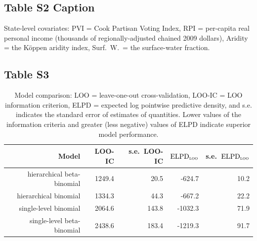 \documentclass[draft]{agujournal}
\begin{document}
\subsection*{Table S2 Caption}
\begin{table}[H]
\centering
\caption{State-level covariates: PVI = Cook Partisan Voting Index, RPI = per-capita real personal income (thousands of regionally-adjusted chained 2009 dollars), Aridity = the K\"oppen aridity index, Surf.\ W.\ = the surface-water fraction.}
\label{tab:state}
\end{table}

\subsection*{Table S3}
\begin{table}[H]
\centering
\begin{tabular}{rrrrr}
  \hline
Model & LOO-IC & s.e.\ LOO-IC & $\text{ELPD}_{\text{\scshape loo}}$ & s.e.\ $\text{ELPD}_{\text{\scshape loo}}$ \\ 
  \hline
hierarchical beta-binomial & 1249.4 & 20.5 & -624.7 & 10.2 \\ 
  hierarchical binomial & 1334.3 & 44.3 & -667.2 & 22.2 \\ 
  single-level binomial & 2064.6 & 143.8 & -1032.3 & 71.9 \\ 
  single-level beta-binomial & 2438.6 & 183.4 & -1219.3 & 91.7 \\ 
   \hline
\end{tabular}
\caption[Model comparison: LOO.]{Model comparison: LOO = leave-one-out cross-validation, LOO-IC = LOO information criterion, ELPD = expected log pointwise predictive density, and s.e. indicates the standard error of estimates of quantities. Lower values of the information criteria and greater (less negative) values of ELPD indicate superior model performance.} 
\label{tab:loo}
\end{table}
\end{document}

